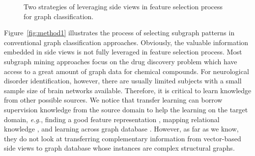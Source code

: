 \documentclass[conference]{IEEEtran}
\begin{document}
\begin{figure}[t]
\centering
\caption{Two strategies of leveraging side views in feature selection process for graph classification.}\label{fig:method}
\end{figure}

Figure~\ref{fig:method1} illustrates the process of selecting subgraph patterns in conventional graph classification approaches. Obviously, the valuable information embedded in side views is not fully leveraged in feature selection process. Most subgraph mining approaches focus on the drug discovery problem which have access to a great amount of graph data for chemical compounds. For neurological disorder identification, however, there are usually limited subjects with a small sample size of brain networks available. Therefore, it is critical to learn knowledge from other possible sources. We notice that transfer learning can borrow supervision knowledge from the source domain to help the learning on the target domain, \emph{e.g.}, finding a good feature representation \cite{dai2007co}, mapping relational knowledge \cite{mihalkova2007mapping,mihalkova2009transfer}, and learning across graph database \cite{shi2012transfer}. However, as far as we know, they do not look at transferring complementary information from vector-based side views to graph database whose instances are complex structural graphs.
\end{document}
